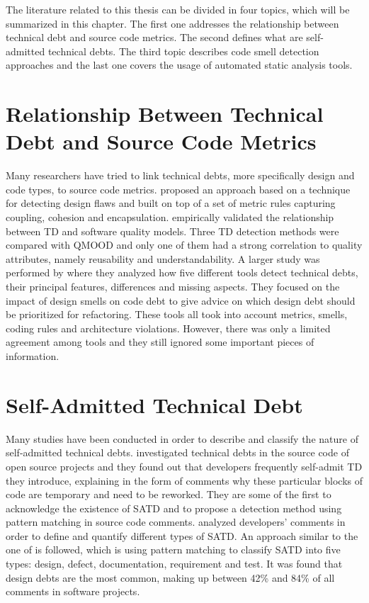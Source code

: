 \label{sec:RevLitt}


\setlength{\parindent}{5ex}The literature related to this thesis can be divided in four topics, which will be summarized in this chapter. The first one addresses the relationship between technical debt and source code metrics. The second defines what are self-admitted technical debts. The third topic describes code smell detection approaches and the last one covers the usage of automated static analysis tools.

\section{Relationship Between Technical Debt and Source Code Metrics}

Many researchers have tried to link technical debts, more specifically design and code types, to source code metrics. \citet{marinescu2012assessing} proposed an approach based on a technique for detecting design flaws and built on top of a set of metric rules capturing coupling, cohesion and encapsulation. \citet{griffith2014correspondence} empirically validated the relationship between \ac{TD} and software quality models. Three \ac{TD} detection methods were compared with \ac{QMOOD} \citep{bansiya2002hierarchical} and only one of them had a strong correlation to quality attributes, namely reusability and understandability. A larger study was performed by \citet{fontana2016technical} where they analyzed how five different tools detect technical debts, their principal features, differences and missing aspects. They focused on the impact of design smells on code debt to give advice on which design debt should be prioritized for refactoring. These tools all took into account metrics, smells, coding rules and architecture violations. However, there was only a limited agreement among tools and they still ignored some important pieces of information.

\section{Self-Admitted Technical Debt}

Many studies have been conducted in order to describe and classify the nature of self-admitted technical debts. \citet{PotdarS14} investigated technical debts in the source code of open source projects and they found out that developers frequently self-admit \ac{TD} they introduce, explaining in the form of comments why these particular blocks of code are temporary and need to be reworked. They are some of the first to acknowledge the existence of \ac{SATD} and to propose a detection method using pattern matching in source code comments. \citet{MaldonadoS15} analyzed developers' comments in order to define and quantify different types of \ac{SATD}. An approach similar to the one of \citet{PotdarS14} is followed, which is using pattern matching to classify \ac{SATD} into five types: design, defect, documentation, requirement and test. It was found that design debts are the most common, making up between 42\% and 84\% of all comments in software projects. \par

